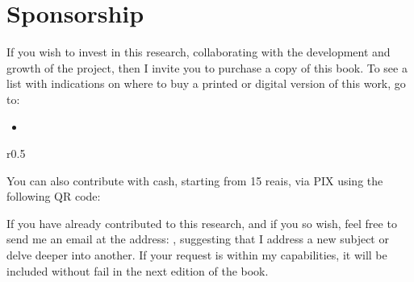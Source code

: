 \cleardoublepage
\pagestyle{empty}



\chapter*{Sponsorship}

\vfill


\begin{tcolorbox}[colback = colorPatrocinio, colframe = colorPatrocinio!80!black]%
If you wish to invest in this research, 
collaborating with the development and growth of the project, 
then I invite you to purchase a copy of this book. 
To see a list with indications on where to buy a printed or digital version of this work, go to:
\begin{itemize}
\item \BookLinkBuy 
\end{itemize}

\begin{wrapfigure}{r}{0.5\textwidth}
\vspace{-10pt}
\centering\BookLinkQrPaymentMethod
\end{wrapfigure}
You can also contribute with cash, starting from 15 reais,  
via PIX using the following QR code: 
    
If you have already contributed to this research, and if you so wish,
feel free to send me an email at the address:
\BookLinkEmail,
suggesting that I address a new subject or delve deeper into another.
If your request is within my capabilities,
it will be included without fail in the next edition of the book.

\begin{flushright}
\BookAuthor ~
\end{flushright}
\end{tcolorbox}%

\vfill

